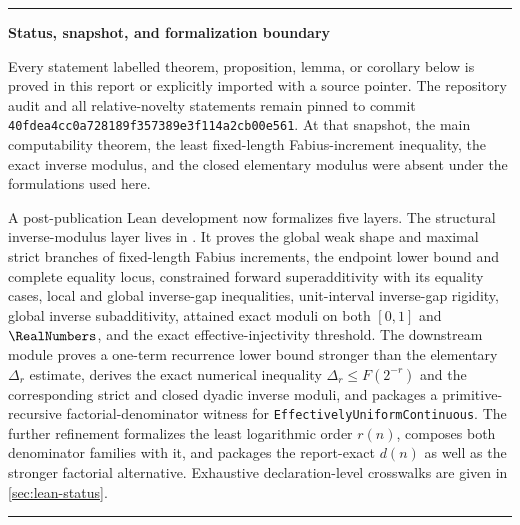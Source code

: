 \documentclass[11pt,oneside]{article}
\theoremstyle{definition}
\theoremstyle{remark}
\numberwithin{equation}{section}
\newcommand{\arrivalcommit}{\nolinkurl{40fdea4cc0a728189f357389e3f114a2cb00e561}}
\newenvironment{statusbox}[1]{%
  \par\smallskip\noindent\begin{center}\begin{minipage}{0.94\textwidth}%
  \color{black}\hrule\vspace{0.55em}\small\noindent\textbf{#1}\par\smallskip
}{%
  \vspace{0.55em}\hrule\end{minipage}\end{center}\smallskip
}
\begin{document}
\begin{abstract}
The report audits the recursive LaTeX corpus under
, separates imported
repository results from the arguments proved here, relates the construction to
$q$-binomial and sinc-product representations, Lambert-$W$ inverse asymptotics,
Legendre expansions, and Bell/Bernoulli coefficient calculi.  It records both
the completed post-publication Lean crosswalks for the structural inverse
modulus, effective uniform continuity, the tolerant-bisection name
transformer, and the final computable-real-function package.  An
exact-rational Python supplement reproduces the finite-spline and modulus
calculations.
\end{abstract}

\begin{statusbox}{Status, snapshot, and formalization boundary}
Every statement labelled theorem, proposition, lemma, or corollary below is
proved in this report or explicitly imported with a source pointer.  The
repository audit and all relative-novelty statements remain pinned to commit
\arrivalcommit.  At that snapshot, the main computability theorem, the least
fixed-length Fabius-increment inequality, the exact inverse modulus, and the
closed elementary modulus were absent under the formulations used here.

A post-publication Lean development now formalizes five layers.  The structural
inverse-modulus layer lives in
.  It
proves the global weak shape and maximal strict branches of fixed-length
Fabius increments, the endpoint lower bound and complete equality locus,
constrained forward superadditivity with its equality cases, local and global
inverse-gap inequalities, unit-interval inverse-gap rigidity, global inverse
subadditivity, attained exact moduli on both $[0,1]$ and $\RealNumbers$, and the exact
effective-injectivity threshold.  The downstream module
proves a one-term recurrence lower bound stronger than the elementary
$\Delta_r$ estimate, derives the exact numerical inequality
$\Delta_r\le F(2^{-r})$ and the corresponding strict and closed dyadic inverse
moduli, and packages a primitive-recursive factorial-denominator witness for
\texttt{EffectivelyUniformContinuous}.  The further refinement
formalizes the least logarithmic order $r(n)$, composes both denominator
families with it, and packages the report-exact $d(n)$ as well as the stronger
factorial alternative.  Exhaustive declaration-level crosswalks are given in
\cref{sec:lean-status}.


\end{statusbox}
\end{document}
